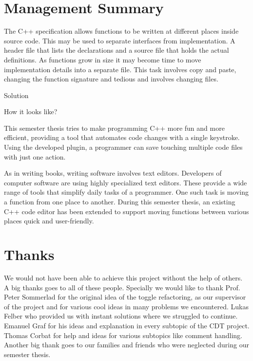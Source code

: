 \chapter*{Management Summary}

The C++ specification allows functions to be written at different places inside source code. This may be used to separate interfaces from implementation. A header file that lists the declarations and a source file that holds the actual definitions. As functions grow in size it may become time to move implementation details into a separate file. This task involves copy and paste, changing the function signature and tedious and involves changing  files.

Solution

How it looks like?



This semester thesis tries to make programming C++ more fun and more efficient, 
providing a tool that automates code changes with a single keystroke. Using the 
developed plugin, a programmer can save touching multiple code files with just 
one action.

As in writing books, writing software involves text editors. Developers of 
computer software are using highly specialized text editors. These provide a 
wide range of tools that simplify daily tasks of a programmer. One such task is 
moving a function from one place to another. During this semester thesis, an 
existing C++ code editor has been extended to support moving functions between 
various places quick and user-friendly.
\thispagestyle{empty}
\pagebreak

\chapter*{Thanks}
We would not have been able to achieve this project without the help of others.
A big thanks goes to all of these people.\newline
Specially we would like to thank Prof. Peter Sommerlad for the original idea
of the toggle refactoring, as our supervisor of the project and for various cool
ideas in many problems we encountered. Lukas Felber who provided us with
instant solutions where we struggled to continue. Emanuel Graf for his ideas and
explanation in every subtopic of the CDT project. Thomas Corbat for help and
ideas for various subtopics like comment handling. \newline
Another big thank goes to our families and friends who were neglected during our
semester thesis.
\thispagestyle{empty}

